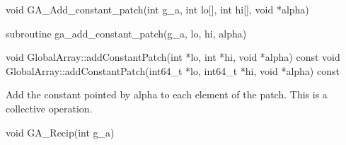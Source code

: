 \documentclass[12pt]{article}
\begin{document}
\begin{capi}
\begin{ccode}
void GA_Add_constant_patch(int g_a, int lo[], int hi[], void *alpha)
\end{ccode}
\begin{funcargs}
\end{funcargs}
\end{capi}

\begin{fapi}
\begin{fcode}
subroutine ga_add_constant_patch(g_a, lo, hi, alpha)
\end{fcode}
\begin{funcargs}
\end{funcargs}
\end{fapi}

\begin{cxxapi}
\begin{cxxcode}
void GlobalArray::addConstantPatch(int *lo, int *hi, void *alpha) const
void GlobalArray::addConstantPatch(int64_t *lo, int64_t *hi, void *alpha) const
\end{cxxcode}
\begin{funcargs}
\end{funcargs}
\end{cxxapi}



\gcoll

\begin{desc}

Add the constant pointed by alpha to each element of the patch.
This is a collective operation.
\end{desc}


\begin{capi}
\begin{ccode}
void GA_Recip(int g_a)
\end{ccode}
\begin{funcargs}
\end{funcargs}
\end{capi}
\end{document}
